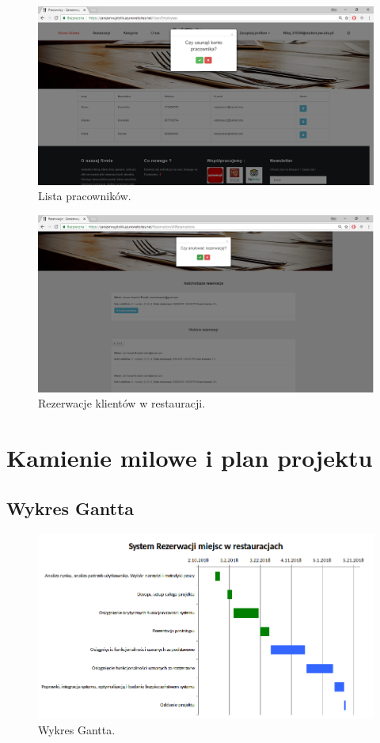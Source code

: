 \documentclass{article}
\begin{document}
\begin{figure}[H]
\centering
	\includegraphics[width=1.00\textwidth]{screens/employees2.png}
	\caption{Lista pracowników.}
\end{figure}

\begin{figure}[H]
\centering
	\includegraphics[width=1.00\textwidth]{screens/restaurantRes.png}
	\caption{Rezerwacje klientów w restauracji.}
\end{figure}

\newpage

\section{Kamienie milowe i plan projektu}
\subsection{Wykres Gantta}

\begin{figure}[h]
\centering
	\includegraphics[width=1\textwidth]{gantt.png}
	\caption{Wykres Gantta.}
	\label{fig:gantt}
\end{figure}
\end{document}
